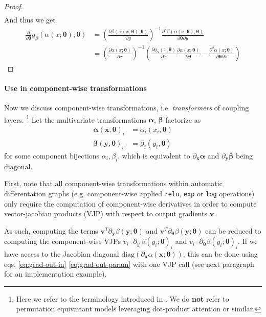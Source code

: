 \documentclass{article}
\begin{document}
\begin{proof}
\begin{align}
    \end{align}
    And thus we get
    \begin{align}
        \frac{\partial}{\partial \bm \theta} g_{\beta}(\alpha(x; \bm \theta); \bm \theta) 
        &= \left( \frac{\partial \beta(\alpha(x; \bm \theta); \bm \theta)}{\partial y}  \right)^{-1} \frac{\partial^{2}\beta(\alpha(x; \bm \theta); \bm \theta)}{\partial \bm \theta \partial y} \\
        &= \left(\frac{\partial \alpha(x; \bm \theta)}{\partial x} \right)^{-1} \left(\frac{\partial g_{\alpha}(x; \bm \theta)}{\partial x} \frac{\partial \alpha(x; \bm \theta)}{\partial \bm \theta}  - \frac{\partial^{2} \alpha(x; \bm \theta)}{\partial \bm \theta \partial x} \right)
    \end{align}
\end{proof}

\paragraph{Use in component-wise transformations}
Now we discuss component-wise transformations, i.e. \emph{transformers} of coupling layers. \footnote{Here we refer to the terminology introduced in \citet{huang2018neural}. We do \textbf{not} refer to permutation equivariant models leveraging dot-product attention or similar.} Let the multivariate transformations $\bm \alpha$, $\bm \beta$ factorize as
\begin{align}
    \bm \alpha(\bm x, \bm \theta)_{i} &= \alpha_{i}(x_i, \bm \theta) \\
    \bm \beta(\bm y, \bm \theta)_{i} &= \beta_{i}(y_i, \bm \theta)
\end{align}
for some component bijections $\alpha_i, \beta_i$, which is equivalent to $\partial_{\bm x} \bm \alpha$ and $\partial_{\bm y} \bm \beta$ being diagonal.

First, note that all component-wise transformations within automatic differentation graphs (e.g. component-wise applied \texttt{relu}, \texttt{exp} or \texttt{log} operations) only require the computation of component-wise derivatives in order to compute vector-jacobian products (VJP) with respect to output gradients $\bm v$.

As such, computing the terms $\bm v^T \partial_{\bm y} \beta(\bm y; \bm \theta)$ and $\bm v^T \partial_{\bm \theta} \beta(\bm y; \bm \theta)$ can be reduced to computing the component-wise VJPs $v_{i} \cdot \partial_{y_{i}}  \beta(y_i; \bm \theta)_{i}$ and $v_{i} \cdot \partial_{\bm \theta}  \beta(y_i; \bm \theta)_{i}$. If we have access to the Jacobian diagonal $\mathrm{diag}\left( \partial_{\bm x} \alpha(\bm x; \bm \theta)\right)$, this can be done using eqs. \eqref{eq:grad-out-in} \eqref{eq:grad-out-param} with one VJP call (see next paragraph for an implementation example).
\end{document}
